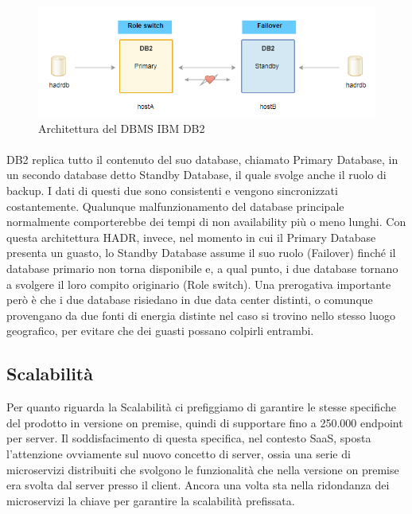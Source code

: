 \begin{figure}[h!]
	\centering
	\includegraphics[width=\textwidth,keepaspectratio=true]{capitoli/imgs/db2.PNG}
	\caption{Architettura del DBMS IBM DB2}
\end{figure}

\paragraph{}
DB2 replica tutto il contenuto del suo database, chiamato Primary Database, in un secondo database detto Standby Database, il quale svolge anche il ruolo di backup. I dati di questi due sono consistenti e vengono sincronizzati costantemente. Qualunque malfunzionamento del database principale normalmente comporterebbe dei tempi di non availability più o meno lunghi. Con questa architettura HADR, invece, nel momento in cui il Primary Database presenta un guasto, lo Standby Database assume il suo ruolo (Failover) finché il database primario non torna disponibile e, a qual punto, i due database tornano a svolgere il loro compito originario (Role switch). Una prerogativa importante però è che i due database risiedano in due data center distinti, o comunque provengano da due fonti di energia distinte nel caso si trovino nello stesso luogo geografico, per evitare che dei guasti possano colpirli entrambi. 

\subsection{Scalabilità}
Per quanto riguarda la Scalabilità ci prefiggiamo di garantire le stesse specifiche del prodotto in versione on premise, quindi di supportare fino a 250.000 endpoint per server. Il soddisfacimento di questa specifica, nel contesto SaaS, sposta l'attenzione ovviamente sul nuovo concetto di server, ossia una serie di microservizi distribuiti che svolgono le funzionalità che nella versione on premise era svolta dal server presso il client. Ancora una volta sta nella ridondanza dei microservizi la chiave per garantire la scalabilità prefissata.

